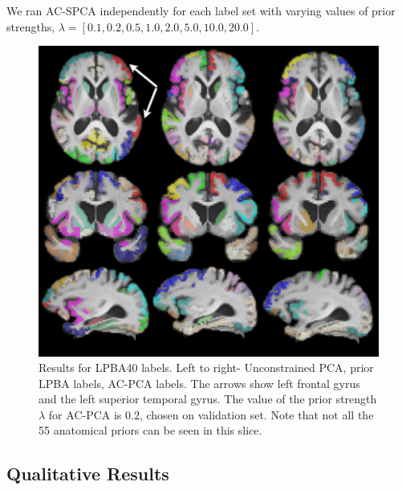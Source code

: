 \documentclass{article}
\begin{document}


\iffalse
We ran AC-SPCA independently for each label set with varying values of prior strengths, $\lambda =[0.1,0.2,0.5,1.0,2.0,5.0,10.0,20.0]$.


\begin{figure}
\begin{center}
\includegraphics[width=0.7\linewidth]{lpba.pdf} 
\end{center}
\vspace{-0.2in}
\caption{Results for LPBA40 labels. Left to right- Unconstrained PCA, prior LPBA labels, AC-PCA labels. The arrows show left frontal gyrus and the left superior temporal gyrus. The value of the prior strength $\lambda$ for AC-PCA is $0.2$, chosen on validation set. Note that not all the 55 anatomical priors can be seen in this slice.}
\label{fig:priorlpba}
\end{figure}


\subsection{Qualitative Results}
\end{document}
